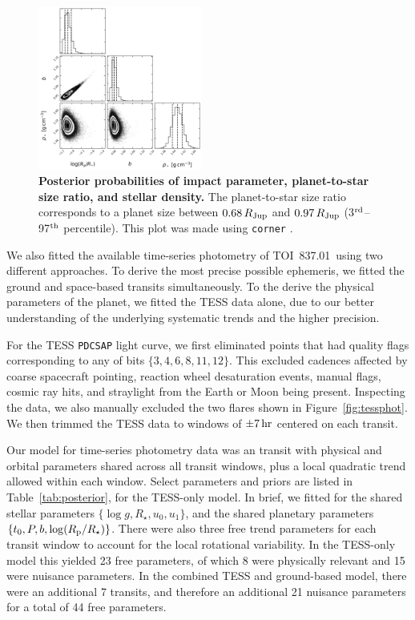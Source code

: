 \documentclass[12pt,twocolumn,tighten]{aastex63}
\newcommand{\pn}{TOI~837.01} %
\begin{document}
%

\begin{figure}[!t]
	\begin{center}
		\leavevmode
		\includegraphics[width=0.48\textwidth]{f10.png}
	\end{center}
	\vspace{-0.5cm}
	\caption{ 
    {\bf Posterior probabilities of impact parameter, planet-to-star
    size ratio, and stellar density.} The  planet-to-star size ratio
    corresponds to a planet size between $0.68\,R_{\rm Jup}$ and
    $0.97\,R_{\rm Jup}$ (3$^{\rm rd}$--97$^{\rm th}$ percentile).
    This plot was made using \texttt{corner} \citep{corner_2016}.
		\label{fig:subsetcorner}
	}
\end{figure}


We also fitted the available time-series photometry of \pn\ using two
different approaches.  To derive the most precise possible ephemeris,
we fitted the ground and space-based transits simultaneously.  To the
derive the physical parameters of the planet, we fitted the TESS data
alone, due to our better understanding of the underlying systematic
trends and the higher precision.

For the TESS \texttt{PDCSAP} light curve, we first eliminated points that had
quality flags corresponding to any of bits $\{3, 4, 6, 8, 11, 12\}$.
This excluded cadences affected by coarse spacecraft pointing,
reaction wheel desaturation events, manual flags, cosmic ray hits, and
straylight from the Earth or Moon being present.  Inspecting the data,
we also manually excluded the two flares shown in
Figure~\ref{fig:tessphot}.  We then trimmed the TESS data to windows
of $\pm 7\,{\rm hr}$ centered on each transit.

Our model for time-series photometry data was an
\citet{exoplanet:agol19} transit with physical and orbital parameters
shared across all transit windows, plus a local quadratic trend
allowed within each window.  Select parameters and priors are listed
in Table~\ref{tab:posterior}, for the TESS-only model.  In brief, we
fitted for the shared stellar parameters $\{\log g, R_\star, u_0,
u_1\}$, and the shared planetary parameters $\{t_0, P, b, \log(R_{\rm
p}/R_\star)\}$.  There were also three free trend parameters for each
transit window to account for the local rotational variability.  In
the TESS-only model this yielded 23 free parameters, of which 8 were
physically relevant and 15 were nuisance parameters.  In the combined
TESS and ground-based model, there were an additional 7 transits, and
therefore an additional 21 nuisance parameters for a total of 44 free
parameters.
\end{document}
